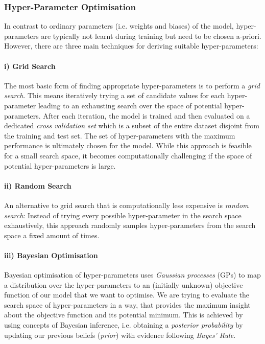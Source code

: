 \subsubsection{Hyper-Parameter Optimisation} \label{sec:hyper-param-optimisation}
In contrast to ordinary parameters (i.e. weights and biases) of the model, hyper-parameters are typically not learnt during training but need to be chosen a-priori. However, there are three main techniques for deriving suitable hyper-parameters:

\paragraph{i) Grid Search} The most basic form of finding appropriate hyper-parameters is to perform a \emph{grid search}. This means iteratively trying a set of candidate values for each hyper-parameter leading to an exhausting search over the space of potential hyper-parameters. After each iteration, the model is trained and then evaluated on a dedicated \emph{cross validation set} which is a subset of the entire dataset disjoint from the training and test set. The set of hyper-parameters with the maximum performance is ultimately chosen for the model.   
While this approach is feasible for a small search space, it becomes computationally challenging if the space of potential hyper-parameters is large. 

\paragraph{ii) Random Search} An alternative to grid search that is computationally less expensive is \emph{random search}: Instead of trying every possible hyper-parameter in the search space exhaustively, this approach randomly samples hyper-parameters from the search space a fixed amount of times. 

\paragraph{iii) Bayesian Optimisation} Bayesian optimisation \cite{bayesian-optimisation} of hyper-parameters uses \emph{Gaussian processes} (GPs) to map a distribution over the hyper-parameters to an (initially unknown) objective function of our model that we want to optimise. We are trying to evaluate the search space of hyper-parameters in a way, that provides the maximum insight about the objective function and its potential minimum.  This is achieved by using concepts of Bayesian inference, i.e. obtaining a \emph{posterior probability} by updating our previous beliefs (\emph{prior}) with evidence following \emph{Bayes' Rule}. 

